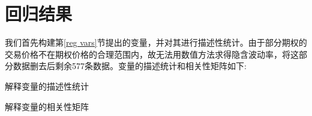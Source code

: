     
\section{回归结果}
我们首先构建第\ref{reg vars}节提出的变量，并对其进行描述性统计。由于部分期权的交易价格不在期权价格的合理范围内，故无法用数值方法求得隐含波动率，将这部分数据删去后剩余577条数据。变量的描述统计和相关性矩阵如下:
\newpage
{}
\begin{landscape} 
    \begin{table}[H]
        \caption{解释变量的描述性统计}
        \resizebox{\linewidth}{!}{
        
        }
    \end{table}
    \begin{table}[H]
        \caption{解释变量的相关性矩阵}
        \resizebox{\linewidth}{!}{    }
    \end{table}    
\end{landscape}

